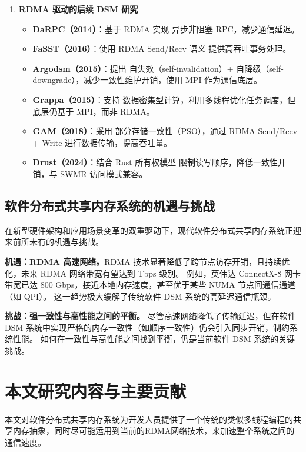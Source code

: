 {\begin{enumerate}[leftmargin=1em, align=left]
    \item \textbf{RDMA 驱动的后续 DSM 研究}

          \begin{itemize}
            \item \textbf{DaRPC（2014）}：基于 RDMA 实现 异步非阻塞 RPC，减少通信延迟。
            \item \textbf{FaSST（2016）}：使用 RDMA Send/Recv 语义 提供高吞吐事务处理。
            \item \textbf{Argodsm（2015）}：提出 自失效（self-invalidation）+ 自降级（self-downgrade），减少一致性维护开销，使用 MPI 作为通信底层。
            \item \textbf{Grappa（2015）}：支持 数据密集型计算，利用多线程优化任务调度，但底层仍基于 MPI，而非 RDMA。
            \item \textbf{GAM（2018）}：采用 部分存储一致性（PSO），通过 RDMA Send/Recv + Write 进行数据传输，提高吞吐量。
            \item \textbf{Drust（2024）}：结合 Rust 所有权模型 限制读写顺序，降低一致性开销，与 SWMR 访问模式兼容。
          \end{itemize}

  \end{enumerate}

  \subsection{软件分布式共享内存系统的机遇与挑战}
  在新型硬件架构和应用场景变革的双重驱动下，现代软件分布式共享内存系统正迎来前所未有的机遇与挑战。

  \textbf{机遇：RDMA 高速网络。}RDMA 技术显著降低了跨节点访存开销，且持续优化，未来 RDMA 网络带宽有望达到 Tbps 级别。
  例如，英伟达 ConnectX-8 网卡带宽已达 800 Gbps，接近本地内存速度，甚至优于某些 NUMA 节点间通信通道（如 QPI）。
  这一趋势极大缓解了传统软件 DSM 系统的高延迟通信瓶颈。

  \textbf{挑战：强一致性与高性能之间的平衡。} 尽管高速网络降低了传输延迟，但在软件 DSM 系统中实现严格的内存一致性（如顺序一致性）仍会引入同步开销，制约系统性能。
  如何在一致性与高性能之间找到平衡，仍是当前软件 DSM 系统的关键挑战。

  \section{本文研究内容与主要贡献}
  本文对软件分布式共享内存系统为开发人员提供了一个传统的类似多线程编程的共享内存抽象，同时尽可能运用到当前的RDMA网络技术，来加速整个系统之间的通信速度。

}
